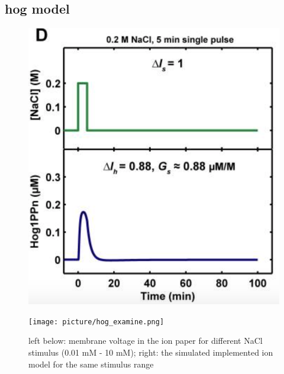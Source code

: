 \subsection{hog model}



\begin{figure}[htbp]
	
	\begin{minipage}{0,5\textwidth}
		
		\includegraphics[width=\textwidth]{picture/Hog_Paper.png}
		
		\label{IonPaddper} 
	\end{minipage}
	\begin{minipage}{0,5\textwidth}
		
		\texttt{[image: picture/hog\_examine.png]}
		
		\label{IonImpdlemented} 
	\end{minipage}
	\caption{left below: membrane voltage in the ion paper for different NaCl stimulus (0.01 mM - 10 mM); right: the simulated implemented ion model for the same stimulus range }
\end{figure}

